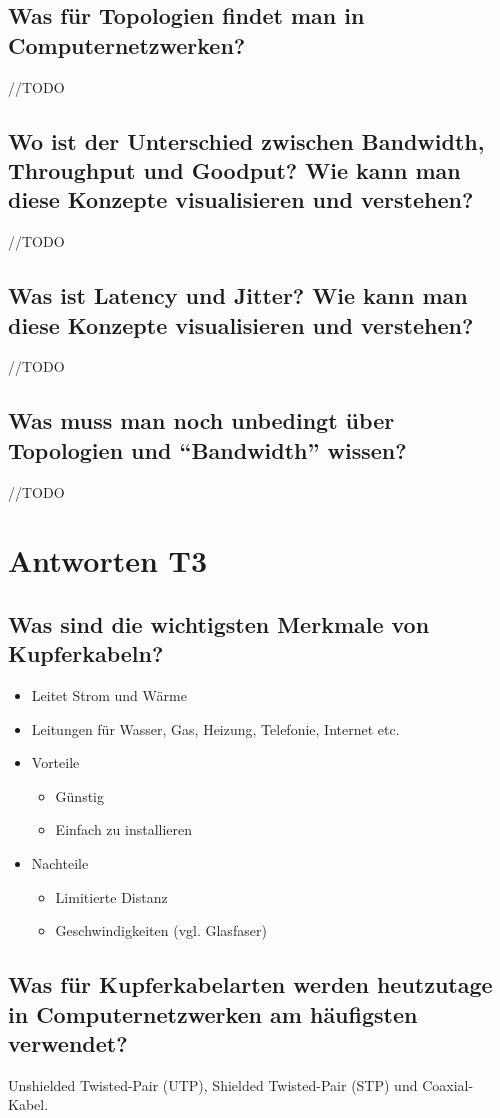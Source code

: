 \subsection*{Was für Topologien findet man in Computernetzwerken?}
//TODO
\subsection*{Wo ist der Unterschied zwischen \flqq{}Bandwidth\frqq, \flqq{}Throughput\frqq{} und \flqq{}Goodput\frqq? Wie kann man diese Konzepte visualisieren und verstehen?}
//TODO
\subsection*{Was ist \flqq{}Latency\frqq{} und \flqq{}Jitter\frqq? Wie kann man diese Konzepte visualisieren und verstehen?}
//TODO
\subsection*{Was muss man noch unbedingt über Topologien und ``Bandwidth'' wissen?}
//TODO

\section{Antworten T3}
\subsection*{Was sind die wichtigsten Merkmale von Kupferkabeln?}
\begin{itemize}
    \item Leitet Strom und Wärme
    \item Leitungen für Wasser, Gas, Heizung, Telefonie, Internet etc.
    \item Vorteile
    \begin{itemize}
        \item Günstig
        \item Einfach zu installieren
    \end{itemize}
    \item Nachteile
    \begin{itemize}
        \item Limitierte Distanz
        \item Geschwindigkeiten (vgl. Glasfaser)
    \end{itemize}
\end{itemize}

\subsection*{Was für Kupferkabelarten werden heutzutage in Computernetzwerken am häufigsten verwendet?}
Unshielded Twisted-Pair (UTP), Shielded Twisted-Pair (STP) und Coaxial-Kabel.

